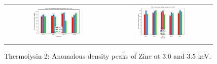 \begin{figure}
    \centering
    \begin{tabular}{cc}
        \includegraphics[width = 0.5\textwidth]{plots/exp1/tlys_2_P6122/peaks/3p0_zn_2Dbar.png} & \includegraphics[width = 0.5\textwidth]{plots/exp1/tlys_2_P6122/peaks/3p5_zn_2Dbar.png}
    \end{tabular}
    \caption{Thermolysin 2: Anomalous density peaks of Zinc at 3.0 and 3.5 \unit{keV}.}
    \label{fig:tlys2_zn_peaks}
\end{figure}